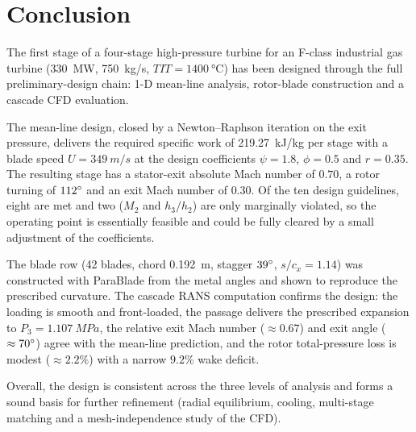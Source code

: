 \chapter{Conclusion}

The first stage of a four-stage high-pressure turbine for an F-class industrial
gas turbine (\SI{330}{MW}, \SI{750}{kg/s}, $TIT=\SI{1400}{\degreeCelsius}$) has
been designed through the full preliminary-design chain: 1-D mean-line analysis,
rotor-blade construction and a cascade CFD evaluation.

The mean-line design, closed by a Newton--Raphson iteration on the exit pressure,
delivers the required specific work of \SI{219.27}{kJ/kg} per stage with a blade
speed $U = \SI{349}{m/s}$ at the design coefficients $\psi = 1.8$, $\phi = 0.5$
and $r = 0.35$. The resulting stage has a stator-exit absolute Mach number of
$0.70$, a rotor turning of $112^\circ$ and an exit Mach number of $0.30$. Of the
ten design guidelines, eight are met and two ($M_2$ and $h_3/h_2$) are only
marginally violated, so the operating point is essentially feasible and could be
fully cleared by a small adjustment of the coefficients.

The blade row (42 blades, chord \SI{0.192}{m}, stagger $39^\circ$, $s/c_x=1.14$)
was constructed with ParaBlade from the metal angles and shown to reproduce the
prescribed curvature. The cascade RANS computation confirms the design: the
loading is smooth and front-loaded, the passage delivers the prescribed expansion
to $P_3 = \SI{1.107}{MPa}$, the relative exit Mach number ($\approx 0.67$) and
exit angle ($\approx 70^\circ$) agree with the mean-line prediction, and the rotor
total-pressure loss is modest ($\approx 2.2\%$) with a narrow $9.2\%$ wake
deficit.

Overall, the design is consistent across the three levels of analysis and forms a
sound basis for further refinement (radial equilibrium, cooling, multi-stage
matching and a mesh-independence study of the CFD).
